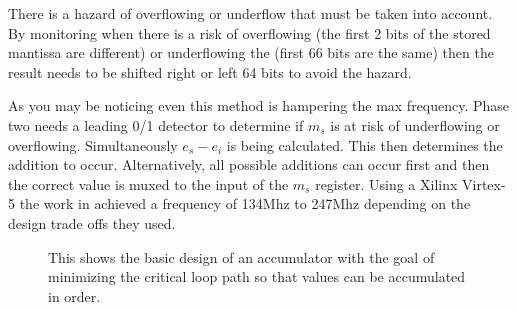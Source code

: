There is a hazard of overflowing or underflow that must be taken into account. By monitoring when there is a risk of overflowing (the first 2 bits of the stored mantissa are different) or underflowing the (first 66 bits are the same) then the result needs to be shifted right or left 64 bits to avoid the hazard.

As you may be noticing even this method is hampering the max frequency. Phase two needs a leading 0/1 detector to determine if $m_s$ is at risk of underflowing or overflowing. Simultaneously $e_s - e_i$ is being calculated. This then determines the addition to occur. Alternatively, all possible additions can occur first and then the correct value is muxed to the input of the $m_s$ register. Using a Xilinx Virtex-5 the work in \cite{prelim:bachir} achieved a frequency of 134Mhz to 247Mhz depending on the design trade offs they used.

\begin{figure}
    \caption[The in-order accumulator.]{This shows the basic design of an accumulator with the goal of minimizing the critical loop path so that values can be accumulated in order.}
    \label{fig:single_cycle_accumulator}
\end{figure}

